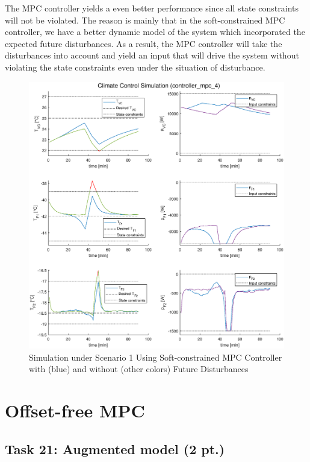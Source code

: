 \documentclass[a4paper,twoside,11pt]{article}
\numberwithin{equation}{section}
\begin{document}
The MPC controller yields a even better performance since all state constraints will not be violated. The reason is mainly that in the soft-constrained MPC controller, we have a better dynamic model of the system which incorporated the expected future disturbances. As a result, the MPC controller will take the disturbances into account and yield an input that will drive the system without violating the state constraints even under the situation of disturbance. 


\begin{figure}[ht]
\centering
\includegraphics[scale = 0.58]{image/20.eps}
\caption{Simulation under Scenario 1 Using Soft-constrained MPC Controller with (blue) and without (other colors) Future Disturbances}
\label{fig:19}
\end{figure}

\newpage


\section{Offset-free MPC}

\subsection{Task 21: Augmented model (2 pt.)}
\end{document}
